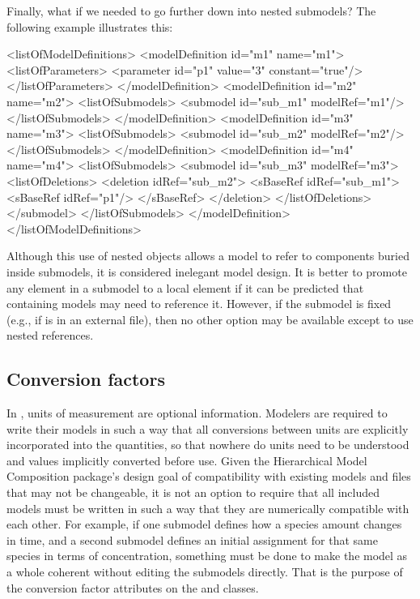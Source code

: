 Finally, what if we needed to go further down into nested submodels?
The following example illustrates this:

\begin{example}
<listOfModelDefinitions> 
  <modelDefinition id="m1" name="m1">
    <listOfParameters>
      <parameter id="p1" value="3" constant="true"/>
    </listOfParameters>
  </modelDefinition>
  <modelDefinition id="m2" name="m2">
    <listOfSubmodels>
      <submodel id="sub_m1" modelRef="m1"/>
    </listOfSubmodels>
  </modelDefinition>
  <modelDefinition id="m3" name="m3">
    <listOfSubmodels>
      <submodel id="sub_m2" modelRef="m2"/>
    </listOfSubmodels>
  </modelDefinition>
  <modelDefinition id="m4" name="m4">
    <listOfSubmodels>
      <submodel id="sub_m3" modelRef="m3">
        <listOfDeletions>
          <deletion idRef="sub_m2">
            <sBaseRef idRef="sub_m1">
              <sBaseRef idRef="p1"/>
            </sBaseRef>
          </deletion>
        </listOfDeletions>
      </submodel>
    </listOfSubmodels>
  </modelDefinition>
</listOfModelDefinitions> 
\end{example}


Although this use of nested \SBaseRef objects allows a model to refer to
components buried inside submodels, it is considered inelegant model
design.  It is better to promote any element in a submodel to a local
element if it can be predicted that containing models may need to
reference it.  However, if the submodel is fixed (e.g., if is in an
external file), then no other option may be available except to use
nested references.



\subsection{Conversion factors}
\label{conversion-factors}

In \sbmlthreecore, units of measurement are optional
information.  Modelers are required to write their models in such a way
that all conversions between units are explicitly incorporated into the
quantities, so that nowhere do units need to be understood and values
implicitly converted before use.  Given the Hierarchical Model
Composition package's design goal of compatibility with existing models
and files that may not be changeable, it is not an option to require
that all included models must be written in such a way that they are
numerically compatible with each other.  For example, if one submodel
defines how a species amount changes in time, and a second submodel
defines an initial assignment for that same species in terms of
concentration, something must be done to make the model as a whole
coherent without editing the submodels directly.  That is the purpose of
the conversion factor attributes on the \ReplacedElement and \Submodel
classes.


